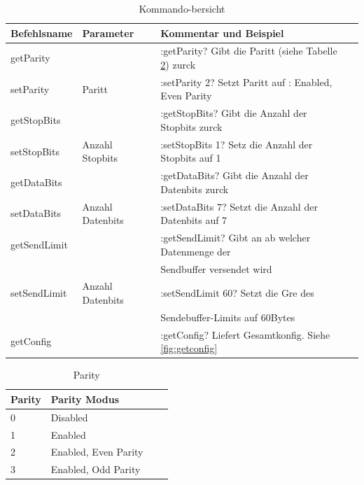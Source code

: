 \documentclass[a4paper]{book}%
\begin{document}
\vspace{1 cm}

\begin{table}[H]

\caption[Kommando-bersicht]{Kommando-bersicht}
\label{tab:kommandos}

\begin{tabular}[H]{llll}\toprule
Befehlsname  & Parameter   							& Kommentar und Beispiel\\ \midrule
getParity    &   												& :getParity? Gibt die Paritt (siehe Tabelle \ref{parity}) zurck   \\
setParity    & Paritt								  & :setParity 2? Setzt Paritt auf : Enabled, Even Parity     \\
\hline
getStopBits  & 											    & :getStopBits? Gibt die Anzahl der Stopbits zurck   \\
setStopBits  & Anzahl Stopbits					& :setStopBits 1? Setz die Anzahl der Stopbits auf 1 \\ 
\hline
getDataBits  &  												& :getDataBits? Gibt die Anzahl der Datenbits zurck \\ 
setDataBits  & Anzahl Datenbits 				& :setDataBits 7? Setzt die Anzahl der Datenbits auf 7\\ 
\hline
getSendLimit  &  												& :getSendLimit? Gibt an ab welcher Datenmenge der\\
							&													&  Sendbuffer versendet wird \\ 
setSendLimit  & Anzahl Datenbits 				& :setSendLimit 60? Setzt die Gre des \\
							&													&  Sendebuffer-Limits auf 60Bytes\\ 
\hline
getConfig    & 													& :getConfig? Liefert Gesamtkonfig. Siehe \ref{fig:getconfig}  \\ \bottomrule
\end{tabular}
\end{table}


\vspace{1 cm}


\begin{table}[H]

\caption[Parity]{Parity}
\label{parity}

\centering
\begin{tabular}[H]{llll}\toprule
Parity  & Parity Modus \\ \midrule
0    		& Disabled \\
1    		& Enabled\\
2  			& Enabled, Even Parity \\
3  			& Enabled, Odd Parity\\ \bottomrule

\end{tabular}

\end{table}
\end{document}
